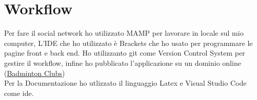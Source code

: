 \documentclass{article}
\begin{document}
    \section{Workflow}

Per fare il social network ho utilizzato MAMP per lavorare in locale sul mio computer, L'IDE che ho utilizzato è Brackets che ho usato per programmare le pagine front e back end. Ho utilizzanto git come Version Control System per gestire il workflow, infine ho pubblicato l'applicazione su un dominio online 
(\href{https://www.marcobissessur.it}{Badminton Clubs}) \\
Per la Documentazione ho utlizzato il linguaggio Latex e Visual Studio Code come ide.
    

    
    
    
\end{document}
